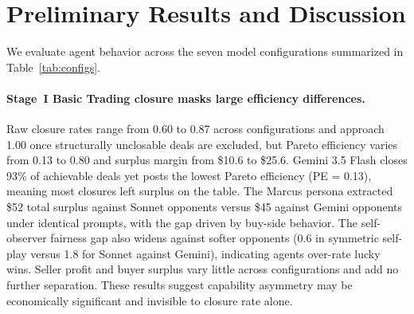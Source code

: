 \documentclass{article} %
\begin{document}
\section{Preliminary Results and Discussion}
\label{sec:experiments}
We evaluate agent behavior across the seven model configurations summarized in Table~\ref{tab:configs}.

\paragraph{Stage~I Basic Trading closure masks large efficiency differences.}
Raw closure rates range from 0.60 to 0.87 across configurations and approach 1.00 once structurally unclosable deals are excluded, but Pareto efficiency varies from 0.13 to 0.80 and surplus margin from \$10.6 to \$25.6. Gemini 3.5 Flash closes 93\% of achievable deals yet posts the lowest Pareto efficiency (PE = 0.13), meaning most closures left surplus on the table. The Marcus persona extracted \$52 total surplus against Sonnet opponents versus \$45 against Gemini opponents under identical prompts, with the gap driven by buy-side behavior. The self-observer fairness gap also widens against softer opponents (0.6 in symmetric self-play versus 1.8 for Sonnet against Gemini), indicating agents over-rate lucky wins. Seller profit and buyer surplus vary little across configurations and add no further separation. These results suggest capability asymmetry may be economically significant and invisible to closure rate alone.
\end{document}

